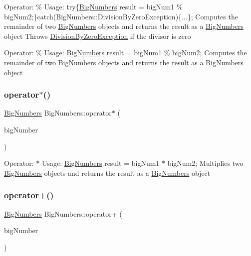 Operator\+: \% Usage\+: try\{\mbox{\hyperlink{class_big_numbers}{Big\+Numbers}} result = big\+Num1 \% big\+Num2;\}catch(\+Big\+Numbers\+::\+Division\+By\+Zero\+Exception)\{...\}; Computes the remainder of two \mbox{\hyperlink{class_big_numbers}{Big\+Numbers}} objects and returns the result as a \mbox{\hyperlink{class_big_numbers}{Big\+Numbers}} object Throws \mbox{\hyperlink{class_big_numbers_1_1_division_by_zero_exception}{Division\+By\+Zero\+Exception}} if the divisor is zero

Operator\+: \% Usage\+: \mbox{\hyperlink{class_big_numbers}{Big\+Numbers}} result = big\+Num1 \% big\+Num2; Computes the remainder of two \mbox{\hyperlink{class_big_numbers}{Big\+Numbers}} objects and returns the result as a \mbox{\hyperlink{class_big_numbers}{Big\+Numbers}} object \mbox{\label{class_big_numbers_a831e8203da581ad999f9f45940a92776}} 
\subsubsection{\texorpdfstring{operator$\ast$()}{operator*()}}
{\footnotesize\ttfamily \mbox{\hyperlink{class_big_numbers}{Big\+Numbers}} Big\+Numbers\+::operator$\ast$ (\begin{DoxyParamCaption}\item[{const \mbox{\hyperlink{class_big_numbers}{Big\+Numbers}} \&}]{big\+Number }\end{DoxyParamCaption})}

Operator\+: $\ast$ Usage\+: \mbox{\hyperlink{class_big_numbers}{Big\+Numbers}} result = big\+Num1 $\ast$ big\+Num2; Multiplies two \mbox{\hyperlink{class_big_numbers}{Big\+Numbers}} objects and returns the result as a \mbox{\hyperlink{class_big_numbers}{Big\+Numbers}} object \mbox{\label{class_big_numbers_a680111de22672f72e0e102b42352d3bc}} 
\subsubsection{\texorpdfstring{operator+()}{operator+()}}
{\footnotesize\ttfamily \mbox{\hyperlink{class_big_numbers}{Big\+Numbers}} Big\+Numbers\+::operator+ (\begin{DoxyParamCaption}\item[{const \mbox{\hyperlink{class_big_numbers}{Big\+Numbers}} \&}]{big\+Number }\end{DoxyParamCaption})}

